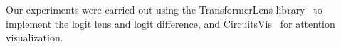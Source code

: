 {Our experiments were carried out using the TransformerLens library~\cite{nanda2022transformerlens} to implement the logit lens and logit difference, and CircuitsVis~\cite{cooney2023circuitsvis} for attention visualization.}



